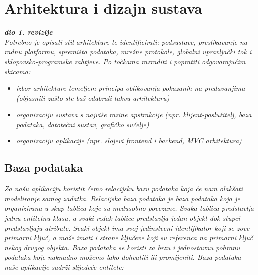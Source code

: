 \chapter{Arhitektura i dizajn sustava}
		
		\textbf{\textit{dio 1. revizije}}\\

		\textit{ Potrebno je opisati stil arhitekture te identificirati: podsustave, preslikavanje na radnu platformu, spremišta podataka, mrežne protokole, globalni upravljački tok i sklopovsko-programske zahtjeve. Po točkama razraditi i popratiti odgovarajućim skicama:}
	\begin{itemize}
		\item 	\textit{izbor arhitekture temeljem principa oblikovanja pokazanih na predavanjima (objasniti zašto ste baš odabrali takvu arhitekturu)}
		\item 	\textit{organizaciju sustava s najviše razine apstrakcije (npr. klijent-poslužitelj, baza podataka, datotečni sustav, grafičko sučelje)}
		\item 	\textit{organizaciju aplikacije (npr. slojevi frontend i backend, MVC arhitektura) }		
	\end{itemize}

	
		

		

				
		\section{Baza podataka}
			
			
		\textit{Za našu aplikaciju koristit ćemo relacijsku bazu podataka koja će nam olakšati modeliranje samog zadatka. 
		Relacijska baza podataka je baza podataka koja je organizirana u skup tablica koje su međusobno povezane. 
		Svaka tablica predstavlja jednu entitetnu klasu, a svaki redak tablice predstavlja jedan objekt dok stupci predstavljaju atribute. 
		Svaki objekt ima svoj jedinstveni identifikator koji se zove primarni ključ, a može imati i strane ključeve koji su referenca na primarni ključ nekog drugog objekta.
		Baza podataka se koristi za brzu i jednostavnu pohranu podataka koje naknadno možemo lako dohvatiti ili promijeniti.
		Baza podataka naše aplikacije sadrži slijedeće entitete: 
		}\\

